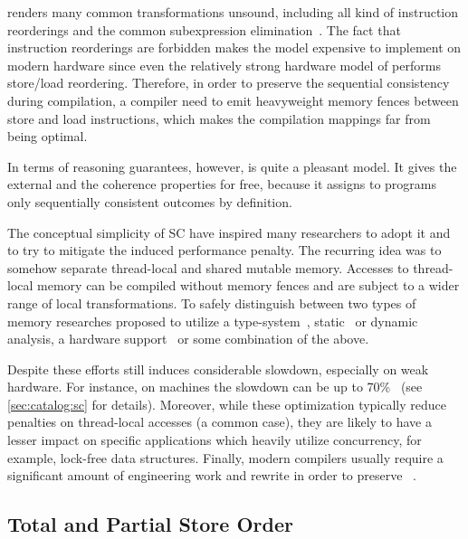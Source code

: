\SC renders many common transformations unsound, 
including all kind of instruction reorderings and the
common subexpression elimination~\cite{Marino-al:PLDI11, Sevcik-Aspinall:ECOOP08}.
The fact that instruction reorderings are forbidden 
makes the model expensive to implement on modern hardware
since even the relatively strong hardware model of \Intel
performs store/load reordering.
Therefore, in order to preserve the sequential consistency during compilation,
a compiler need to emit heavyweight memory fences 
between store and load instructions,
which makes the compilation mappings far from being optimal.  

In terms of reasoning guarantees, however, \SC is quite a pleasant model. 
It gives the external \DRF and the coherence properties for free, 
because it assigns to programs only sequentially consistent
outcomes by definition.

The conceptual simplicity of SC have inspired many researchers 
to adopt it and to try to mitigate the induced performance penalty.
The recurring idea was to somehow separate 
thread-local and shared mutable memory.
Accesses to thread-local memory can be compiled 
without memory fences and are subject to a wider range 
of local transformations.
To safely distinguish between two types of memory
researches proposed to utilize a type-system~\cite{Vollmer-al:PPoPP17},
static~\cite{Singh-al:ISCA12} or dynamic~\cite{Liu-al:PLDI19} analysis,
a hardware support~\cite{Singh-al:ISCA12, Marino-al:PLDI10}
or some combination of the above. 

Despite these efforts \SC still induces considerable slowdown,
especially on weak hardware.
For instance, on  machines 
the slowdown can be up to 70\%~\cite{Liu-al:PLDI19} 
(see \cref{sec:catalog:sc} for details).
Moreover, while these optimization typically reduce 
penalties on thread-local accesses (a common case), 
they are likely to have a lesser impact on specific 
applications which heavily utilize concurrency,
for example, lock-free data structures.
Finally, modern compilers usually require 
a significant amount of engineering work and rewrite
in order to preserve \SC~\cite{Marino-al:PLDI11, Liu-al:PLDI19}.

\subsection{Total and Partial Store Order}
\label{sec:analysis:tso}

